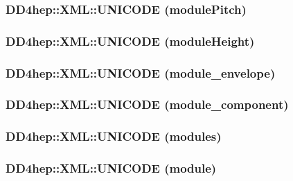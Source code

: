 \hypertarget{namespace_d_d4hep_1_1_x_m_l_ada6a75e6c0c54ecd53340fa1ddd1a32f}{
\subsubsection[{UNICODE}]{\setlength{\rightskip}{0pt plus 5cm}DD4hep::XML::UNICODE (modulePitch)}}
\label{namespace_d_d4hep_1_1_x_m_l_ada6a75e6c0c54ecd53340fa1ddd1a32f}
\hypertarget{namespace_d_d4hep_1_1_x_m_l_a60cd41b01ef952ecf409bd435f9d73fc}{
\subsubsection[{UNICODE}]{\setlength{\rightskip}{0pt plus 5cm}DD4hep::XML::UNICODE (moduleHeight)}}
\label{namespace_d_d4hep_1_1_x_m_l_a60cd41b01ef952ecf409bd435f9d73fc}
\hypertarget{namespace_d_d4hep_1_1_x_m_l_aa50cd77c10950a1ec1948ece8a837fa7}{
\subsubsection[{UNICODE}]{\setlength{\rightskip}{0pt plus 5cm}DD4hep::XML::UNICODE (module\_\-envelope)}}
\label{namespace_d_d4hep_1_1_x_m_l_aa50cd77c10950a1ec1948ece8a837fa7}
\hypertarget{namespace_d_d4hep_1_1_x_m_l_a369200919680954eee237afd8c25556e}{
\subsubsection[{UNICODE}]{\setlength{\rightskip}{0pt plus 5cm}DD4hep::XML::UNICODE (module\_\-component)}}
\label{namespace_d_d4hep_1_1_x_m_l_a369200919680954eee237afd8c25556e}
\hypertarget{namespace_d_d4hep_1_1_x_m_l_aa8467fc611f341ca8e61ad197414c986}{
\subsubsection[{UNICODE}]{\setlength{\rightskip}{0pt plus 5cm}DD4hep::XML::UNICODE (modules)}}
\label{namespace_d_d4hep_1_1_x_m_l_aa8467fc611f341ca8e61ad197414c986}
\hypertarget{namespace_d_d4hep_1_1_x_m_l_a93c8cbfeffaed013e345e6fe45106a7c}{
\subsubsection[{UNICODE}]{\setlength{\rightskip}{0pt plus 5cm}DD4hep::XML::UNICODE (module)}}

